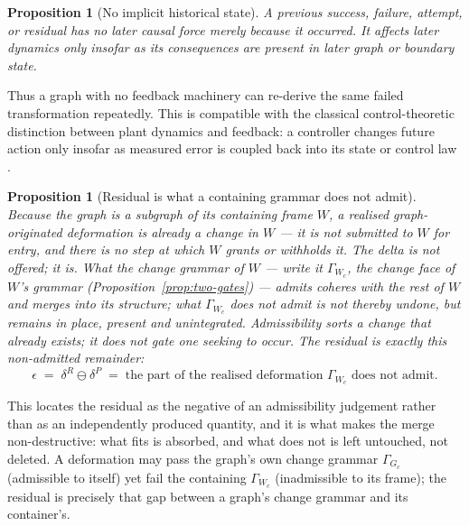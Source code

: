 \documentclass[11pt,a4paper]{article}
\newtheorem{proposition}[definition]{Proposition}
\theoremstyle{remark}\newtheorem{remark}[definition]{Remark}
\begin{document}
\begin{proposition}[No implicit historical state]\label{prop:no-implicit-historical-state}
A previous success, failure, attempt, or residual has no later causal force merely because it occurred. It affects later dynamics only insofar as its consequences are present in later graph or boundary state.
\end{proposition}
Thus a graph with no feedback machinery can re-derive the same failed transformation repeatedly. This is compatible with the classical control-theoretic distinction between plant dynamics and feedback: a controller changes future action only insofar as measured error is coupled back into its state or control law \citep{wiener1948,ashby1956}.

\begin{proposition}[Residual is what a containing grammar does not admit]\label{prop:residual-inadmissible}
Because the graph is a subgraph of its containing frame $W$, a realised graph-originated deformation is \emph{already} a change in $W$ --- it is not submitted to $W$ for entry, and there is no step at which $W$ grants or withholds it. The delta is not offered; it \emph{is}. What the \emph{change grammar} of $W$ --- write it $\Gamma_{W_c}$, the change face of $W$'s grammar (Proposition~\ref{prop:two-gates}) --- admits coheres with the rest of $W$ and merges into its structure; what $\Gamma_{W_c}$ does not admit is not thereby undone, but remains in place, present and unintegrated. Admissibility sorts a change that already exists; it does not gate one seeking to occur. The residual is exactly this non-admitted remainder:
\[
\boxed{\epsilon \;=\; \delta^R \ominus \delta^P \;=\; \text{the part of the realised deformation }\Gamma_{W_c}\text{ does not admit.}}
\]
\end{proposition}
This locates the residual as the negative of an admissibility judgement rather than as an independently produced quantity, and it is what makes the merge non-destructive: what fits is absorbed, and what does not is left untouched, not deleted. A deformation may pass the graph's own change grammar $\Gamma_{G_c}$ (admissible to itself) yet fail the containing $\Gamma_{W_c}$ (inadmissible to its frame); the residual is precisely that gap between a graph's change grammar and its container's.
\end{document}
